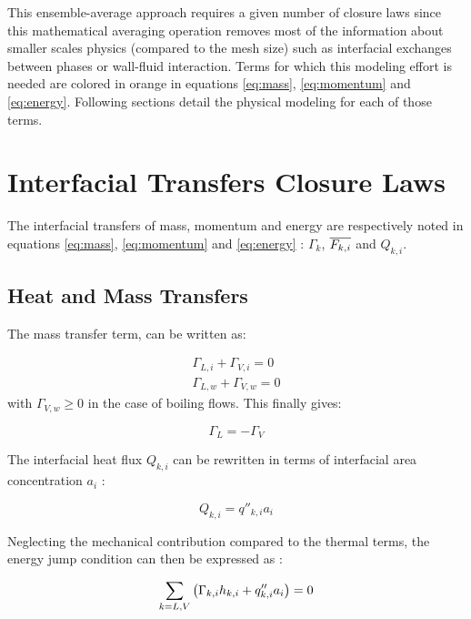 \npar

This ensemble-average approach requires a given number of closure laws since this mathematical averaging operation removes most of the information about smaller scales physics (compared to the mesh size) such as interfacial exchanges between phases or wall-fluid interaction. Terms for which this modeling effort is needed are colored in orange in equations \ref{eq:mass}, \ref{eq:momentum} and \ref{eq:energy}. Following sections detail the physical modeling for each of those terms. 


\section{Interfacial Transfers Closure Laws}
\label{sec:int_transfers}

The interfacial transfers of mass, momentum and energy are respectively noted in equations \ref{eq:mass}, \ref{eq:momentum} and \ref{eq:energy} : $\Gamma_{k}$, $\overline{F_{k,i}}$ and $Q_{k,i}$.

\subsection{Heat and Mass Transfers}
\label{subsec:ncfd_interf_mass}


The mass transfer term, can be written as: 

\begin{align}
\Gamma_{L,i} + \Gamma_{V,i} = 0\\
%
\Gamma_{L,w} + \Gamma_{V,w} = 0
\end{align}
with $\Gamma_{V,w} \geq 0$ in the case of boiling flows. This finally gives:

\begin{equation}
\Gamma_{L}=-\Gamma_{V}
\end{equation}

\npar
The interfacial heat flux $Q_{k,i}$ can be rewritten in terms of interfacial area concentration $a_{i}$ : 

\begin{equation}
Q_{k,i}=q''_{k,i}a_{i}
\end{equation} 

\npar

Neglecting the mechanical contribution compared to the thermal terms, the energy jump condition can then be expressed as :

\begin{equation}
\sum_{k=L,V}\left( \Gamma_{k,i}h_{k,i} + q''_{k,i}a_{i} \right)=0
\label{eq:ncfd_energy_jump}
\end{equation}

